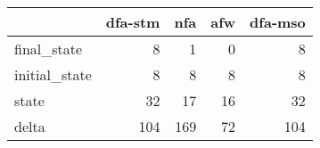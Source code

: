 \begin{tabular}{lrrrr}
\toprule
{} &  dfa-stm &  nfa &  afw &  dfa-mso \\
\midrule
final\_state   &        8 &    1 &    0 &        8 \\
initial\_state &        8 &    8 &    8 &        8 \\
state         &       32 &   17 &   16 &       32 \\
delta         &      104 &  169 &   72 &      104 \\
\bottomrule
\end{tabular}
